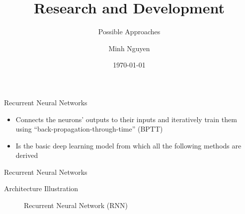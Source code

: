 \documentclass[12pt]{beamer}
\title{Research and Development}
\subtitle{Possible Approaches}
\date{\today}
\author{Minh Nguyen}
\begin{document}
\maketitle

\begin{frame}{Recurrent Neural Networks}
    \begin{alertblock}{}
        \begin{itemize}
            \item Connects the neurons' outputs to their inputs and iteratively train them using ``back-propagation-through-time'' (BPTT)
            \item Is the basic deep learning model from which all the following methods are derived
        \end{itemize}
    \end{alertblock}
\end{frame}

\begin{frame}{Recurrent Neural Networks}
    \begin{alertblock}{Architecture Illustration}
        \begin{figure}[t!]
            \centering
            \setlength{\fboxsep}{1pt}%
            \setlength{\fboxrule}{0.5pt}%
            \caption{Recurrent Neural Network (RNN) \cite{langkvist2014review}}
        \end{figure}
    \end{alertblock}
\end{frame}
\end{document}
